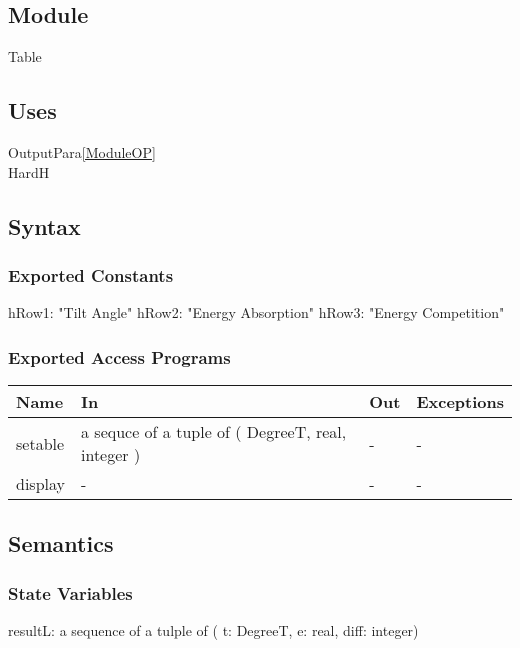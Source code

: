 \documentclass[12pt, titlepage]{article}
\begin{document}
\subsection{Module}
Table\\

\subsection{Uses}
OutputPara\ref{ModuleOP}\\
HardH\\


\subsection{Syntax}

\subsubsection{Exported Constants}

hRow1: "Tilt Angle"
hRow2: "Energy Absorption"
hRow3: "Energy Competition"

\subsubsection{Exported Access Programs}

\begin{center}
\begin{tabular}{p{2cm} p{5cm} p{5cm} p{2cm}}
\hline
\textbf{Name} & \textbf{In} & \textbf{Out} & \textbf{Exceptions} \\
\hline 
setable & a sequce of a tuple of ( DegreeT, real, integer ) & - & - \\
display & - & - & - \\

\hline
\end{tabular}
\end{center}


\subsection{Semantics}

\subsubsection{State Variables}

resultL: a sequence of a tulple of ( t: DegreeT, e: real, diff: integer)\\
\end{document}
